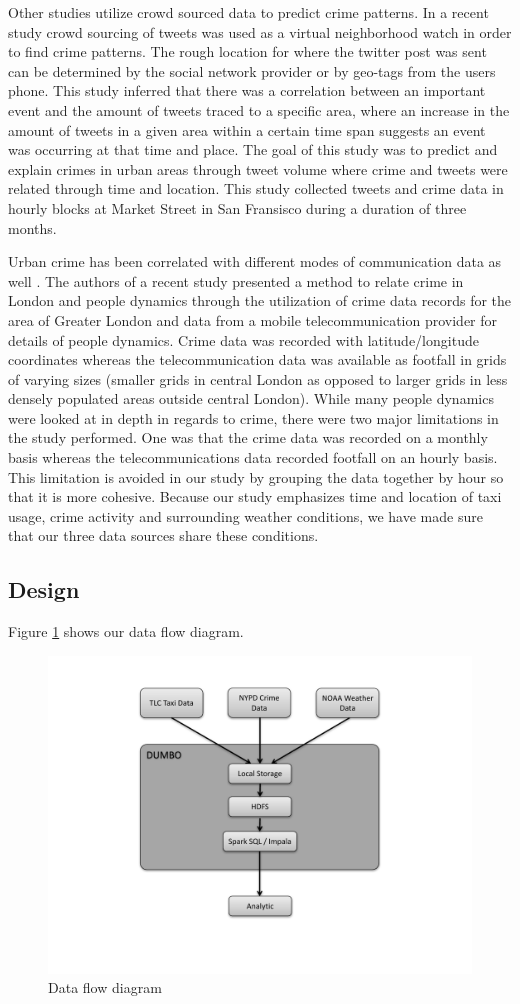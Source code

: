\documentclass{sigkddExp}
\begin{document}
Other studies utilize crowd sourced data to predict crime patterns. In a recent study \cite{Bendler14} crowd sourcing of tweets was used as a virtual neighborhood watch in order to find crime patterns. The rough location for where the twitter post was sent can be determined by the social network provider or by geo-tags from the users phone. This study inferred that there was a correlation between an important event and the amount of tweets traced to a specific area, where an increase in the amount of tweets in a given area within a certain time span suggests an event was occurring at that time and place. The goal of this study was to predict and explain crimes in urban areas through tweet volume where crime and tweets were related through time and location. This study collected tweets and crime data in hourly blocks at Market Street in San Fransisco during a duration of three months. 

Urban crime has been correlated with different modes of communication data as well \cite{Traunmueller14}. The authors of a recent study presented a method to relate crime in London and people dynamics through the utilization of crime data records for the area of Greater London and data from a mobile telecommunication provider for details of people dynamics. Crime data was recorded with latitude/longitude coordinates whereas the telecommunication data was available as footfall in grids of varying sizes (smaller grids in central London as opposed to larger grids in less densely populated areas outside central London). While many people dynamics were looked at in depth in regards to crime, there were two major limitations in the study performed. One was that the crime data was recorded on a monthly basis whereas the telecommunications data recorded footfall on an hourly basis. This limitation is avoided in our study by grouping the data together by hour so that it is more cohesive. Because our study emphasizes time and location of taxi usage, crime activity and surrounding weather conditions, we have made sure that our three data sources share these conditions.


\subsection{Design}
Figure \ref{figx} shows our data flow diagram.

\begin{figure}
\caption{Data flow diagram}
\label{figx}
\includegraphics[width=.5\textwidth]{DesignFlowDiagram.pdf}
\end{figure}
\end{document}
